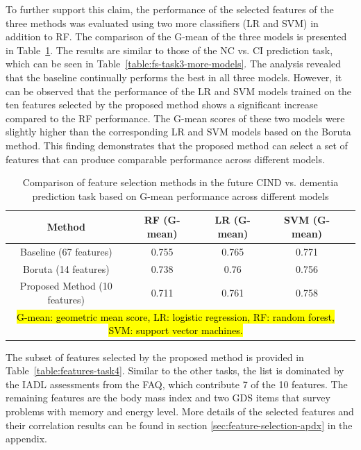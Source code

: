 To further support this claim, the performance of the selected features of the three methods was evaluated using two more classifiers (LR and SVM) in addition to RF. The comparison of the G-mean of the three models is presented in Table~\ref{table:fs-task4-more-models}. The results are similar to those of the NC vs. CI prediction task, which can be seen in Table~\ref{table:fs-task3-more-models}. The analysis revealed that the baseline continually performs the best in all three models. However, it can be observed that the performance of the LR and SVM models trained on the ten features selected by the proposed method shows a significant increase compared to the RF performance. The G-mean scores of these two models were slightly higher than the corresponding LR and SVM models based on the Boruta method. This finding demonstrates that the proposed method can select a set of features that can produce comparable performance across different models.

\begin{table}[!ht]
    \centering
    \caption{Comparison of feature selection methods in the future CIND vs. dementia prediction task based on G-mean performance across different models}
    \begin{tabular}{|c|c|c|c|c|}
    \hline
        Method & RF (G-mean) & LR (G-mean) & SVM (G-mean) \\ \hline
        Baseline (67 features) & 0.755 & 0.765 & 0.771 \\ \hline
        Boruta (14 features) & 0.738 & 0.76 & 0.756 \\ \hline
        Proposed Method (10 features) & 0.711 & 0.761 & 0.758 \\ \hline
        \multicolumn{4}{p{400pt}}{\footnotesize \hl{G-mean: geometric mean score, LR: logistic regression, RF: random forest, SVM: support vector machines.}}
    \end{tabular}
    \label{table:fs-task4-more-models}
\end{table}

The subset of features selected by the proposed method is provided in Table~\ref{table:features-task4}. Similar to the other tasks, the list is dominated by the IADL assessments from the FAQ, which contribute 7 of the 10 features. The remaining features are the body mass index and two GDS items that survey problems with memory and energy level. More details of the selected features and their correlation results can be found in section \ref{sec:feature-selection-apdx} in the appendix.


